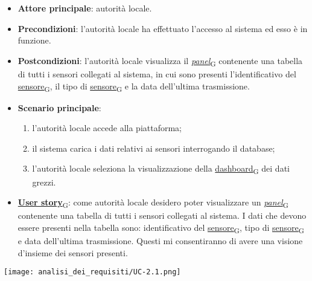 \newpage
{}
\begin{itemize}
	\item \textbf{Attore principale}: autorità locale.
	\item \textbf{Precondizioni}: l'autorità locale ha effettuato l'accesso al sistema ed esso è in funzione.
	\item \textbf{Postcondizioni}: l'autorità locale visualizza il \href{https://7last.github.io/docs/pb/documentazione-interna/glossario\#panel}{\textit{panel}\textsubscript{G}} contenente una tabella di tutti i sensori collegati al sistema,
	      in cui sono presenti l'identificativo del \href{https://7last.github.io/docs/pb/documentazione-interna/glossario\#sensore}{sensore\textsubscript{G}}, il tipo di \href{https://7last.github.io/docs/pb/documentazione-interna/glossario\#sensore}{sensore\textsubscript{G}} e la data dell'ultima trasmissione.
	\item \textbf{Scenario principale}:
	      \begin{enumerate}
		      \item l'autorità locale accede alla piattaforma;
		      \item il sistema carica i dati relativi ai sensori interrogando il database;
		      \item l'autorità locale seleziona la visualizzazione della \href{https://7last.github.io/docs/pb/documentazione-interna/glossario\#dashboard}{dashboard\textsubscript{G}} dei dati grezzi.
	      \end{enumerate}
	\item \href{https://7last.github.io/docs/pb/documentazione-interna/glossario\#user-story}{\textbf{User story}\textsubscript{G}}: come autorità locale desidero poter visualizzare un \href{https://7last.github.io/docs/pb/documentazione-interna/glossario\#panel}{\textit{panel}\textsubscript{G}} contenente una tabella di tutti i sensori collegati al sistema. I dati che devono essere presenti nella tabella sono: identificativo del \href{https://7last.github.io/docs/pb/documentazione-interna/glossario\#sensore}{sensore\textsubscript{G}}, tipo di \href{https://7last.github.io/docs/pb/documentazione-interna/glossario\#sensore}{sensore\textsubscript{G}} e data dell'ultima trasmissione. Questi mi consentiranno di avere una visione d'insieme dei sensori presenti.
\end{itemize}
\begin{center}
	\texttt{[image: analisi\_dei\_requisiti/UC-2.1.png]}
\end{center}

